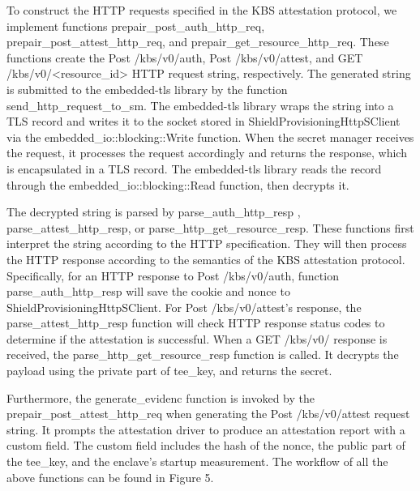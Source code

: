 To construct the HTTP requests specified in the KBS  attestation protocol, we implement functions prepair\_post\_auth\_http\_req, prepair\_post\_attest\_http\_req, and prepair\_get\_resource\_http\_req. These functions create the Post /kbs/v0/auth, Post /kbs/v0/attest, and GET /kbs/v0/<resource\_id> HTTP 
request string, respectively. The generated string is submitted to the embedded-tls library by the function send\_http\_request\_to\_sm. The embedded-tls library wraps the string into a TLS record and writes it to the socket stored in ShieldProvisioningHttpSClient via the embedded\_io::blocking::Write 
function. When the secret manager receives the request, it processes the request accordingly and returns the response, which is encapsulated in a TLS record. The embedded-tls library reads the record through the embedded\_io::blocking::Read function, then decrypts it.

The decrypted string is parsed by parse\_auth\_http\_resp , parse\_attest\_http\_resp, or parse\_http\_get\_resource\_resp. These functions first interpret the string according to the HTTP specification. They will then process the HTTP 
response according to the semantics of the KBS attestation protocol. Specifically, for an HTTP response to Post /kbs/v0/auth, function parse\_auth\_http\_resp will save the cookie and nonce to ShieldProvisioningHttpSClient. For Post /kbs/v0/attest's response, the parse\_attest\_http\_resp function will 
check HTTP response status codes to determine if the attestation is successful. When a GET /kbs/v0/ response is received, the parse\_http\_get\_resource\_resp function is called. It decrypts the payload using the private part of tee\_key, and returns the secret.

Furthermore, the generate\_evidenc function is invoked by the prepair\_post\_attest\_http\_req when generating the Post /kbs/v0/attest request string. It prompts the attestation driver to produce an attestation report with a custom field. The custom field includes the hash of the nonce, 
the public part of the tee\_key, and the enclave's startup measurement. The workflow of all the above functions can be found in Figure 5.                                                                                                                                                                                                                                                                                                  

